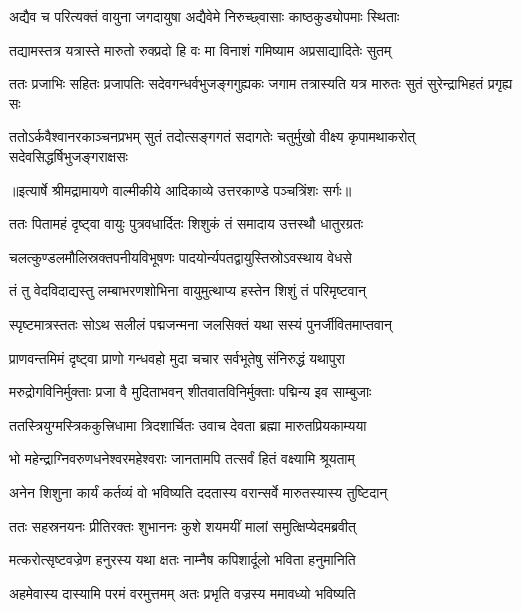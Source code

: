 \twolineshloka
{अद्यैव च परित्यक्तं वायुना जगदायुषा}
{अद्यैवेमे निरुच्छ्वासाः काष्ठकुड्योपमाः स्थिताः} %

\twolineshloka
{तद्यामस्तत्र यत्रास्ते मारुतो रुक्प्रदो हि वः}
{मा विनाशं गमिष्याम अप्रसाद्यादितेः सुतम्} %

\fourlineindentedshloka
{ततः प्रजाभिः सहितः प्रजापतिः}
{सदेवगन्धर्वभुजङ्गगुह्यकः}
{जगाम तत्रास्यति यत्र मारुतः}
{सुतं सुरेन्द्राभिहतं प्रगृह्य सः} %

\fourlineindentedshloka
{ततोऽर्कवैश्वानरकाञ्चनप्रभम्}
{सुतं तदोत्सङ्गगतं सदागतेः}
{चतुर्मुखो वीक्ष्य कृपामथाकरोत्}
{सदेवसिद्धर्षिभुजङ्गराक्षसः} %


{॥इत्यार्षे श्रीमद्रामायणे वाल्मीकीये आदिकाव्ये उत्तरकाण्डे पञ्चत्रिंशः सर्गः॥}


\twolineshloka
{ततः पितामहं दृष्ट्वा वायुः पुत्रवधार्दितः}
{शिशुकं तं समादाय उत्तस्थौ धातुरग्रतः} %

\twolineshloka
{चलत्कुण्डलमौलिस्रक्तपनीयविभूषणः}
{पादयोर्न्यपतद्वायुस्तिस्रोऽवस्थाय वेधसे} %

\twolineshloka
{तं तु वेदविदाद्यस्तु लम्बाभरणशोभिना}
{वायुमुत्थाप्य हस्तेन शिशुं तं परिमृष्टवान्} %

\twolineshloka
{स्पृष्टमात्रस्ततः सोऽथ सलीलं पद्मजन्मना}
{जलसिक्तं यथा सस्यं पुनर्जीवितमाप्तवान्} %

\twolineshloka
{प्राणवन्तमिमं दृष्ट्वा प्राणो गन्धवहो मुदा}
{चचार सर्वभूतेषु संनिरुद्धं यथापुरा} %

\twolineshloka
{मरुद्रोगविनिर्मुक्ताः प्रजा वै मुदिताभवन्}
{शीतवातविनिर्मुक्ताः पद्मिन्य इव साम्बुजाः} %

\twolineshloka
{ततस्त्रियुग्मस्त्रिककुत्त्रिधामा त्रिदशार्चितः}
{उवाच देवता ब्रह्मा मारुतप्रियकाम्यया} %

\twolineshloka
{भो महेन्द्राग्निवरुणधनेश्वरमहेश्वराः}
{जानतामपि तत्सर्वं हितं वक्ष्यामि श्रूयताम्} %

\twolineshloka
{अनेन शिशुना कार्यं कर्तव्यं वो भविष्यति}
{ददतास्य वरान्सर्वे मारुतस्यास्य तुष्टिदान्} %

\twolineshloka
{ततः सहस्रनयनः प्रीतिरक्तः शुभाननः}
{कुशे शयमयीं मालां समुत्क्षिप्येदमब्रवीत्} %

\twolineshloka
{मत्करोत्सृष्टवज्रेण हनुरस्य यथा क्षतः}
{नाम्नैष कपिशार्दूलो भविता हनुमानिति} %

\twolineshloka
{अहमेवास्य दास्यामि परमं वरमुत्तमम्}
{अतः प्रभृति वज्रस्य ममावध्यो भविष्यति} %


